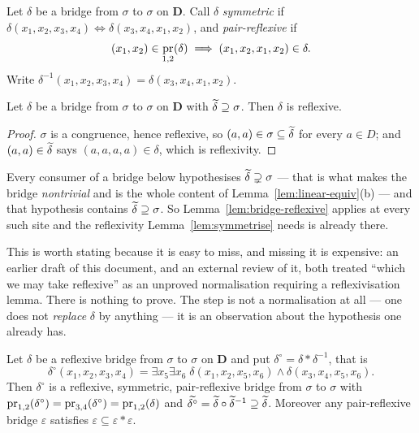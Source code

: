 \begin{definition}\label{def:pair-reflexive}
Let $\delta$ be a bridge from $\sigma$ to $\sigma$ on $\mathbf D$. Call $\delta$
\emph{symmetric} if
$\delta(x_{1},x_{2},x_{3},x_{4})\iff\delta(x_{3},x_{4},x_{1},x_{2})$, and
\emph{pair-reflexive} if
\[
  (x_{1},x_{2})\in\operatorname*{pr}_{1,2}(\delta)\;\Longrightarrow\;
  (x_{1},x_{2},x_{1},x_{2})\in\delta .
\]
Write $\delta^{-1}(x_{1},x_{2},x_{3},x_{4})=\delta(x_{3},x_{4},x_{1},x_{2})$.
\end{definition}

\begin{lemma}\label{lem:bridge-reflexive}
Let $\delta$ be a bridge from $\sigma$ to $\sigma$ on $\mathbf D$ with
$\widetilde{\delta}\supseteq\sigma$. Then $\delta$ is reflexive.
\end{lemma}

\begin{proof}
$\sigma$ is a congruence, hence reflexive, so $(a,a)\in\sigma\subseteq
\widetilde{\delta}$ for every $a\in D$; and $(a,a)\in\widetilde{\delta}$ says
$(a,a,a,a)\in\delta$, which is reflexivity.
\end{proof}

\begin{hazard}\label{haz:reflexivise}
Every consumer of a bridge below hypothesises $\widetilde{\delta}\supsetneq\sigma$
--- that is what makes the bridge \emph{nontrivial} and is the whole content of
Lemma~\ref{lem:linear-equiv}(b) --- and that hypothesis contains
$\widetilde{\delta}\supseteq\sigma$. So Lemma~\ref{lem:bridge-reflexive} applies at
every such site and the reflexivity Lemma~\ref{lem:symmetrise} needs is
already there.

This is worth stating because it is easy to miss, and missing it is expensive:
an earlier draft of this document, and an external review of it, both treated
``which we may take reflexive'' as an unproved normalisation requiring a
reflexivisation lemma. There is nothing to prove. The step is not a
normalisation at all --- one does not \emph{replace} $\delta$ by anything ---
it is an observation about the hypothesis one already has.
\end{hazard}

\begin{lemma}[Symmetrisation]\label{lem:symmetrise}
Let $\delta$ be a reflexive bridge from $\sigma$ to $\sigma$ on $\mathbf D$ and
put $\delta^{\circ}=\delta\ast\delta^{-1}$, that is
\[
  \delta^{\circ}(x_{1},x_{2},x_{3},x_{4})=\exists x_{5}\exists x_{6}\;
  \delta(x_{1},x_{2},x_{5},x_{6})\wedge\delta(x_{3},x_{4},x_{5},x_{6}).
\]
Then $\delta^{\circ}$ is a reflexive, symmetric, pair-reflexive bridge from
$\sigma$ to $\sigma$ with
$\operatorname*{pr}_{1,2}(\delta^{\circ})=\operatorname*{pr}_{3,4}(\delta^{\circ})=\operatorname*{pr}_{1,2}(\delta)$
and $\widetilde{\delta^{\circ}}=\widetilde{\delta}\circ\widetilde{\delta}^{-1}
\supseteq\widetilde{\delta}$. Moreover any pair-reflexive bridge $\varepsilon$
satisfies $\varepsilon\subseteq\varepsilon\ast\varepsilon$.
\end{lemma}

